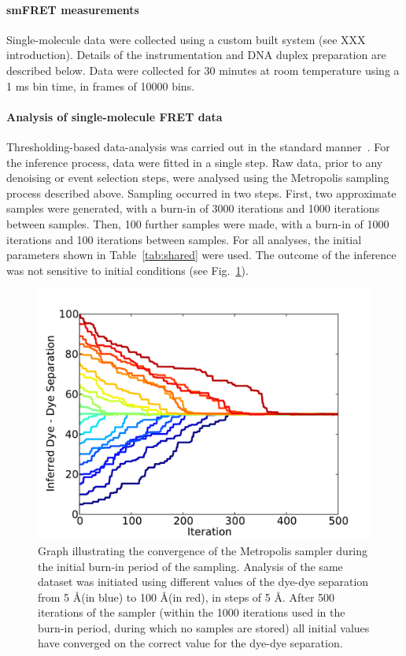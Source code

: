 \paragraph*{smFRET measurements}
Single-molecule data were collected using a custom built system (see XXX introduction). Details of the instrumentation and DNA duplex preparation are described below. Data were collected for 30 minutes at room temperature using a 1 ms bin time, in frames of 10000 bins.

\paragraph*{Analysis of single-molecule FRET data}
Thresholding-based data-analysis was carried out in the standard manner~\cite{deniz01}.  For the inference process, data were fitted in a single step. Raw data, prior to any denoising or event selection steps, were analysed using the Metropolis sampling process described above. Sampling occurred in two steps. First, two approximate samples were generated, with a burn-in of 3000 iterations and 1000 iterations between samples. Then, 100 further samples were made, with a burn-in of 1000 iterations and 100 iterations between samples. For all analyses, the initial parameters shown in Table~\ref{tab:shared} were used. The outcome of the inference was not sensitive to initial conditions (see Fig.~\ref{fig:MC_burnin_convergence}).  

\begin{figure}
   \begin{center}
      \includegraphics*[width=5in]{inference/S3_samples_summary_rsep.pdf}
      \caption{Graph illustrating the convergence of the Metropolis sampler during the initial burn-in period of the sampling. Analysis of the same dataset was initiated using different values of the dye-dye separation from 5 \AA (in blue) to 100 \AA (in red), in steps of 5 \AA. After 500 iterations of the sampler (within the 1000 iterations used in the burn-in period, during which no samples are stored) all initial values have converged on the correct value for the dye-dye separation.}
      \label{fig:MC_burnin_convergence}
   \end{center}
\end{figure}


